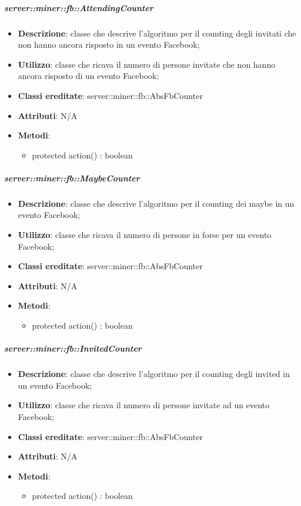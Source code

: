		\subparagraph{server::miner::fb::AttendingCounter} %
		\label{subp:server_miner_fb_AttendingCounter}
			\begin{itemize}
				\item \textbf{Descrizione}: classe che descrive l'algoritmo per il counting degli invitati che non hanno ancora risposto in un evento Facebook;
				\item \textbf{Utilizzo}: classe che ricava il numero di persone invitate che non hanno ancora risposto di un evento Facebook;
				\item \textbf{Classi ereditate}: server::miner::fb::AbsFbCounter
				\item \textbf{Attributi}: N/A
				\item \textbf{Metodi}:  
					\begin{itemize}
						\item protected action() : boolean
					\end{itemize}
			\end{itemize}

		\subparagraph{server::miner::fb::MaybeCounter} %
		\label{subp:server_miner_fb_MaybeCounter}
			\begin{itemize}
				\item \textbf{Descrizione}: classe che descrive l'algoritmo per il counting dei maybe in un evento Facebook;
				\item \textbf{Utilizzo}: classe che ricava il numero di persone in forse per un evento Facebook;
				\item \textbf{Classi ereditate}: server::miner::fb::AbsFbCounter
				\item \textbf{Attributi}: N/A
				\item \textbf{Metodi}:  
					\begin{itemize}
						\item protected action() : boolean
					\end{itemize}
			\end{itemize}

	\subparagraph{server::miner::fb::InvitedCounter} %
		\label{subp:server_miner_fb_InvitedCunter}
			\begin{itemize}
				\item \textbf{Descrizione}: classe che descrive l'algoritmo per il counting degli invited in un evento Facebook;
				\item \textbf{Utilizzo}: classe che ricava il numero di persone invitate ad un evento Facebook;
				\item \textbf{Classi ereditate}: server::miner::fb::AbsFbCounter
				\item \textbf{Attributi}: N/A
				\item \textbf{Metodi}:  
					\begin{itemize}
						\item protected action() : boolean
					\end{itemize}
			\end{itemize}

